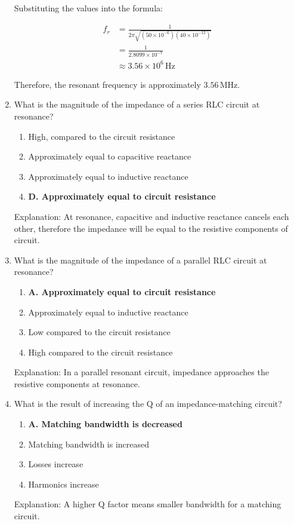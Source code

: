 \begin{enumerate}
Substituting the values into the formula:

\begin{align*}
f_r &= \frac{1}{2\pi\sqrt{(50 \times 10^{-6})(40 \times 10^{-12})}} \\
&= \frac{1}{2.8099 \times 10^{-7}} \\
&\approx 3.56 \times 10^6 \, \text{Hz}
\end{align*}

Therefore, the resonant frequency is approximately $3.56 \, \text{MHz}$.


  \item What is the magnitude of the impedance of a series RLC circuit at resonance?
       \begin{enumerate}
         \item  High, compared to the circuit resistance
        \item  Approximately equal to capacitive reactance
        \item  Approximately equal to inductive reactance
      \item \textbf{D. Approximately equal to circuit resistance}
    \end{enumerate}
       \textcolor{myred}{Explanation:}
         At resonance, capacitive and inductive reactance cancels each other, therefore the impedance will be equal to the resistive components of circuit.

    \item What is the magnitude of the impedance of a parallel RLC circuit at resonance?
    \begin{enumerate}
    \item \textbf{A. Approximately equal to circuit resistance}
     \item  Approximately equal to inductive reactance
       \item  Low compared to the circuit resistance
      \item  High compared to the circuit resistance
    \end{enumerate}
     \textcolor{myred}{Explanation:}
      In a parallel resonant circuit, impedance approaches the resistive components at resonance.
        
        \item What is the result of increasing the Q of an impedance-matching circuit?
    \begin{enumerate}
      \item \textbf{A. Matching bandwidth is decreased}
        \item  Matching bandwidth is increased
        \item  Losses increase
       \item  Harmonics increase
    \end{enumerate}
         \textcolor{myred}{Explanation:}
     A higher Q factor means smaller bandwidth for a matching circuit.


\end{enumerate}
